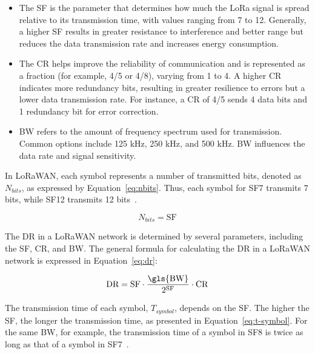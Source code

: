 \documentclass[a4paper,fleqn]{cas-dc}
\begin{document}
\begin{itemize}
    \item The \gls{SF} is the parameter that determines how much the \gls{LoRa} signal is spread relative to its transmission time, with values ranging from 7 to 12. Generally, a higher \gls{SF} results in greater resistance to interference and better range but reduces the data transmission rate and increases energy consumption.

    \item The \gls{CR} helps improve the reliability of communication and is represented as a fraction (for example, 4/5 or 4/8), varying from 1 to 4. A higher \gls{CR} indicates more redundancy bits, resulting in greater resilience to errors but a lower data transmission rate. For instance, a \gls{CR} of 4/5 sends 4 data bits and 1 redundancy bit for error correction.

    \item \gls{BW} refers to the amount of frequency spectrum used for transmission. Common options include 125 kHz, 250 kHz, and 500 kHz. \gls{BW} influences the data rate and signal sensitivity.
\end{itemize}

In \gls{LoRaWAN}, each symbol represents a number of transmitted bits, denoted as \(N_{bits}\), as expressed by Equation~\ref{eq:nbits}. Thus, each symbol for SF7 transmits 7 bits, while SF12 transmits 12 bits~\cite{montagny2021lora, marini2022lpwan}.

\begin{equation} \label{eq:nbits}
    N_{bits} = \text{SF}
\end{equation}

The \gls{DR} in a LoRaWAN network is determined by several parameters, including the \gls{SF}, \gls{CR}, and \gls{BW}. The general formula for calculating the \gls{DR} in a \gls{LoRaWAN} network is expressed in Equation~\ref{eq:dr}:

\begin{equation} \label{eq:dr}
    \text{DR} = \text{SF} \cdot \frac{\text{\gls{BW}}}{2^{\text{SF}}} \cdot \text{CR}
\end{equation}

The transmission time of each symbol, \( T_{symbol} \), depends on the \gls{SF}. The higher the \gls{SF}, the longer the transmission time, as presented in Equation~\ref{eq:t-symbol}. For the same \gls{BW}, for example, the transmission time of a symbol in SF8 is twice as long as that of a symbol in SF7~\cite{montagny2021lora, marini2022lpwan}.
\end{document}
